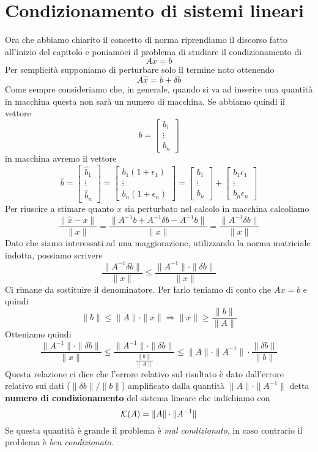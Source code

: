 \section{Condizionamento di sistemi lineari}
Ora che abbiamo chiarito il concetto di norma riprendiamo il discorso fatto all'inizio del capitolo e poniamoci
il problema di studiare il condizionamento di
\[ A x = b \]
Per semplicità supponiamo di perturbare solo il termine noto ottenendo
\[ A \hat{x} = b + \delta b \]
Come sempre consideriamo che, in generale, quando si va ad inserire una quantità in macchina questa non sarà un
numero di macchina. Se abbiamo quindi il vettore
\[ b = \begin{bmatrix} b_1 \\ \vdots \\ b_n \end{bmatrix} \]
in macchina avremo il vettore
\[
	\hat{b} = \begin{bmatrix} \hat{b}_1 \\ \vdots \\ \hat{b}_n \end{bmatrix} =
	\begin{bmatrix} b_1 (1 + \epsilon_1) \\ \vdots \\ b_n (1 + \epsilon_n)	\end{bmatrix} =
	\begin{bmatrix} b_1 \\ \vdots \\ b_n \end{bmatrix} +
	\begin{bmatrix} b_1 \epsilon_1 \\ \vdots \\ b_n \epsilon_n \end{bmatrix}
\]
Per riuscire a stimare quanto $x$ sia perturbato nel calcolo in macchina calcoliamo
\[
	\frac{\| \hat{x} - x \|}{\| x \|} =
	\frac{\| A^{-1} b + A^{-1} \delta b - A^{-1} b \|}{\| x \|} =
	\frac{\| A^{-1} \delta b \|}{\| x \|}
\]
Dato che siamo interessati ad una maggiorazione, utilizzando la norma matriciale indotta, possiamo scrivere
\[ \frac{\| A^{-1} \delta b \|}{\| x \|} \leq \frac{\| A^{-1} \| \cdot \| \delta b \|}{\| x \|} \]
Ci rimane da sostituire il denominatore. Per farlo teniamo di conto che $A x = b$ e quindi
\[ \| b \| \leq \| A \| \cdot \| x \| \Rightarrow \| x \| \geq \frac{\| b \|}{\| A \|} \]
Otteniamo quindi
\[
	\frac{\| A^{-1} \| \cdot \| \delta b \|}{\| x \|} \leq
	\frac{\| A^{-1} \| \cdot \| \delta b \|}{\frac{\| b \|}{\| A \|}} \leq
	\| A \| \cdot \| A^{-1} \| \cdot \frac{\| \delta b \|}{\| b \|}
\]
Questa relazione ci dice che l'errore relativo sul risultato è dato dall'errore relativo sui dati
($\| \delta b \| / \| b \|$) amplificato dalla quantità $\| A \| \cdot \| A^{-1} \|$ detta
\textbf{numero di condizionamento} del sistema lineare che indichiamo con
\[ \mathcal{K} (A) = \| A \| \cdot \| A^{-1} \| \]
Se questa quantità è grande il problema è \emph{mal condizionato}, in caso contrario il problema è
\emph{ben condizionato}.